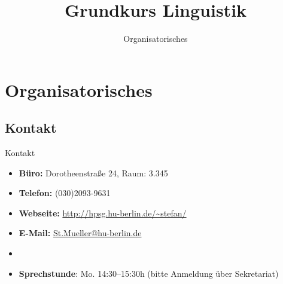 
\title{Grundkurs Linguistik}

\subtitle{Organisatorisches}









	

\section{Organisatorisches}

\subsection{Kontakt}
%

\begin{frame}{Kontakt}

\begin{itemize}
	\item \textbf{Büro:} Dorotheenstraße 24, Raum: 3.345
	\item \textbf{Telefon:} (030)2093-9631
	\item \textbf{Webseite:} \url{http://hpsg.hu-berlin.de/~stefan/}
	\item \textbf{E-Mail:} \href{mailto:St.Mueller@hu-berlin.de}{St.Mueller@hu-berlin.de}
	\item[]
	\item \textbf{Sprechstunde}: Mo. 14:30--15:30h (bitte Anmeldung über Sekretariat)
\end{itemize}	

\end{frame}

